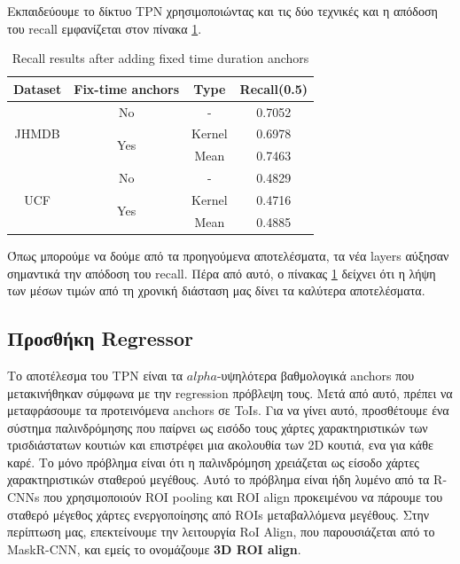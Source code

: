 \documentclass{report}
\begin{document}
Εκπαιδεύουμε το δίκτυο TPN χρησιμοποιώντας και τις δύο τεχνικές και η  απόδοση του recall  εμφανίζεται στον πίνακα  \ref{table:add_16}.

\begin{table}[h]
  \centering
  \begin{tabular}{||c | c | c || c ||}
    \hline
    \textbf{Dataset} & \textbf{Fix-time anchors} & \textbf{Type} & \textbf{Recall(0.5)} \\
    \hline  \hline
    \multirow{3}{4em}{JHMDB} & No &  - & 0.7052 \\
    \cline{2-4}
    {} & \multirow{2}{*}{Yes} & Kernel & 0.6978 \\
    \cline{3-4}
    {} & {} & Mean & 0.7463 \\
    \hline
    \multirow{3}{4em}{UCF} & No & - & 0.4829 \\
    \cline{2-4}
    {} & \multirow{2}{*}{Yes} & Kernel & 0.4716 \\
    \cline{3-4}
    {} & {} & Mean & 0.4885 \\
    \hline      
  \end{tabular}
  \caption{Recall results after adding fixed time duration anchors}
  \label{table:add_16}
\end{table}

Όπως μπορούμε να δούμε από τα προηγούμενα αποτελέσματα, τα νέα layers αύξησαν σημαντικά την απόδοση του recall. Πέρα από αυτό, ο πίνακας \ref{table:add_16} δείχνει ότι
η λήψη των μέσων τιμών από τη χρονική διάσταση μας δίνει τα καλύτερα αποτελέσματα.


\subsection{Προσθήκη Regressor}
Το αποτέλεσμα του TPN είναι τα $alpha$-υψηλότερα βαθμολογικά anchors που μετακινήθηκαν σύμφωνα με την regression πρόβλεψη τους. Μετά από αυτό, πρέπει να μεταφράσουμε τα
προτεινόμενα anchors σε ToIs.
Για να γίνει αυτό, προσθέτουμε ένα σύστημα παλινδρόμησης που παίρνει ως εισόδο τους χάρτες χαρακτηριστικών των τρισδιάστατων κουτιών και επιστρέφει μια ακολουθία των 2D κουτιά,
ενα για κάθε καρέ.
Το μόνο πρόβλημα είναι ότι η παλινδρόμηση χρειάζεται ως είσοδο χάρτες χαρακτηριστικών  σταθερού μεγέθους. Αυτό το πρόβλημα είναι ήδη λυμένο από τα  R-CNNs που χρησιμοποιούν ROI pooling
και ROI align προκειμένου να πάρουμε του σταθερό μέγεθος χάρτες ενεργοποίησης από ROIs μεταβαλλόμενα μεγέθους. Στην περίπτωση μας, επεκτείνουμε την λειτουργία RoI Align, που παρουσιάζεται
από το MaskR-CNN, και εμείς το ονομάζουμε \textbf{3D ROI align}.
\end{document}

